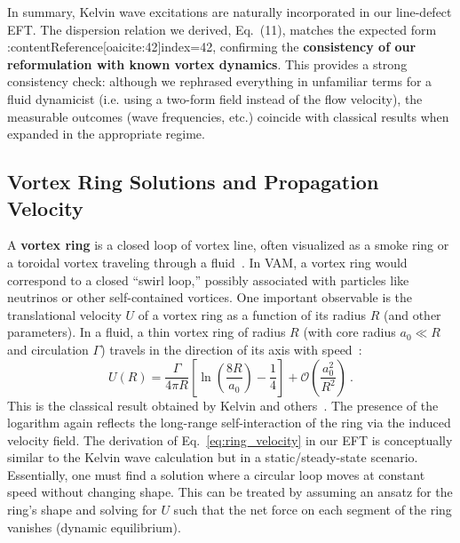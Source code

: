 \documentclass[12pt]{article}
\begin{document}
In summary, Kelvin wave excitations are naturally incorporated in our line-defect EFT. The dispersion relation we derived, Eq. (11), matches the expected form :contentReference[oaicite:42]{index=42}, confirming the \textbf{consistency of our reformulation with known vortex dynamics}. This provides a strong consistency check: although we rephrased everything in unfamiliar terms for a fluid dynamicist (i.e. using a two-form field instead of the flow velocity), the measurable outcomes (wave frequencies, etc.) coincide with classical results when expanded in the appropriate regime.

\subsection{Vortex Ring Solutions and Propagation Velocity}

A \textbf{vortex ring} is a closed loop of vortex line, often visualized as a smoke ring or a toroidal vortex traveling through a fluid~\cite{ref:kelvin,ref:lamb}. In VAM, a vortex ring would correspond to a closed ``swirl loop,'' possibly associated with particles like neutrinos or other self-contained vortices. One important observable is the translational velocity $U$ of a vortex ring as a function of its radius $R$ (and other parameters). In a fluid, a thin vortex ring of radius $R$ (with core radius $a_0 \ll R$ and circulation $\Gamma$) travels in the direction of its axis with speed~\cite{ref:saffman}:
\begin{equation}
    U(R) = \frac{\Gamma}{4\pi R}\left[\ln\left(\frac{8R}{a_0}\right) - \frac{1}{4}\right] + \mathcal{O}\left(\frac{a_0^2}{R^2}\right)~.
    \label{eq:ring_velocity}
\end{equation}
This is the classical result obtained by Kelvin and others~\cite{ref:kelvin}. The presence of the logarithm again reflects the long-range self-interaction of the ring via the induced velocity field. The derivation of Eq.~\eqref{eq:ring_velocity} in our EFT is conceptually similar to the Kelvin wave calculation but in a static/steady-state scenario. Essentially, one must find a solution where a circular loop moves at constant speed without changing shape. This can be treated by assuming an ansatz for the ring’s shape and solving for $U$ such that the net force on each segment of the ring vanishes (dynamic equilibrium).
\end{document}
